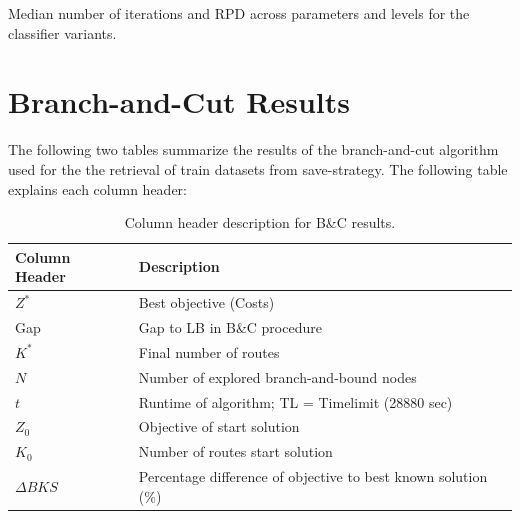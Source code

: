 \begin{table}[!ht]
	\caption{Median number of iterations and RPD across parameters and levels for the classifier variants.}
	\label{tab:numerical_results_paramStudy_classifiers}
\end{table}


\clearpage
\section{Branch-and-Cut Results}

The following two tables summarize the results of the branch-and-cut algorithm used for the the retrieval of train datasets
from save-strategy. The following table explains each column header:

\begin{table}[ht]
	\centering
	\small
	\begin{tabular}{C{0.2\textwidth}C{0.74\textwidth}}
		\toprule
		Column Header & Description                                                    \\
		\midrule
		$Z^*$         & Best objective (Costs)                                         \\
		Gap           & Gap to \gls{LB} in B\&C procedure                              \\
		$K^*$         & Final number of routes                                         \\
		$N$           & Number of explored branch-and-bound nodes                      \\
		$t$           & Runtime of algorithm; TL = Timelimit (28880 sec)               \\
		$Z_0$         & Objective of start solution                                    \\
		$K_0$         & Number of routes start solution                                \\
		$\Delta BKS$  & Percentage difference of objective to best known solution (\%) \\
		\bottomrule
	\end{tabular}
	\caption{Column header description for B\&C results.}
	\label{tab:column_header_description_bc}
\end{table}


